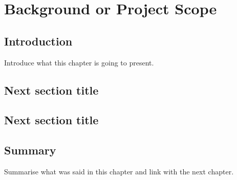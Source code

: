 \chapter{Background or Project Scope}

\section{Introduction}
Introduce what this chapter is going to present.
\section{Next section title}

\section{Next section title}

\section{Summary}
Summarise what was said in this chapter and link with the next chapter.
